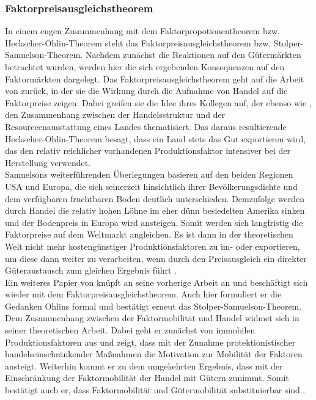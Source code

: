 \subsubsection*{Faktorpreisausgleichstheorem}
%
In einem engen Zusammenhang mit dem Faktorpropotionentheorem bzw. Heckscher-Ohlin-Theorem steht das Faktorpreisausgleichstheorem bzw. Stolper-Samuelson-Theorem. Nachdem zunächst die Reaktionen auf den Gütermärkten betrachtet wurden, werden hier die sich ergebenden Konsequenzen auf den Faktormärkten dargelegt. Das Faktorpreisausgleichstheorem geht auf die Arbeit von \cite{Samuelson.1941} zurück, in der sie die Wirkung durch die Aufnahme von Handel auf die Faktorpreise zeigen. Dabei greifen sie die Idee ihres Kollegen \cite{Ohlin.1933} auf, der ebenso wie \cite{Heckscher.1919}, den Zusammenhang zwischen der Handelsstruktur und der Resourccenausstattung eines Landes thematisiert. Das daraus resultierende Heckscher-Ohlin-Theorem besagt, dass ein Land stets das Gut exportieren wird, das den relativ reichlicher vorhandenen Produktionsfaktor intensiver bei der Herstellung verwendet. \\
%
 Samuelsons weiterführenden Überlegungen basieren auf den beiden Regionen USA und Europa, die sich seinerzeit hinsichtlich ihrer Bevölkerungsdichte und dem verfügbaren fruchtbaren Boden deutlich unterschieden. Demzufolge werden durch Handel die relativ hohen Löhne im eher dünn besiedelten Amerika sinken und der Bodenpreis in Europa  wird ansteigen. Somit werden sich langfristig die Faktorpreise auf dem Weltmarkt angleichen. Es ist dann in der theoretischen Welt nicht mehr kostengünstiger Produktionsfaktoren zu im- oder exportieren, um diese dann weiter zu verarbeiten, wenn durch den Preisausgleich ein direkter Güteraustausch zum gleichen Ergebnis führt \cite{Samuelson.1948}.\\
Ein weiteres Papier von \cite{Samuelson.1949} knüpft an seine vorherige Arbeit an und beschäftigt sich wieder mit dem Faktorpreisausgleichstheorem. Auch hier formuliert er die Gedanken Ohlins formal und bestätigt erneut das Stolper-Samuelson-Theorem. \\
%
Dem Zusammenhang zwischen der Faktormobilität und Handel widmet sich \cite{Mundell.1957} in seiner theoretischen Arbeit. Dabei geht er zunächst von immobilen Produktionsfaktoren aus und zeigt, dass mit der Zunahme protektionistischer handelseinschränkender Maßnahmen die Motivation zur Mobilität der Faktoren ansteigt. Weiterhin kommt er zu dem umgekehrten Ergebnis, dass mit der Einschränkung der Faktormobilität der Handel mit Gütern zunimmt. Somit bestätigt auch er, dass Faktormobilität und Gütermobilität substituierbar sind \cite{Mundell.1957}.\\
